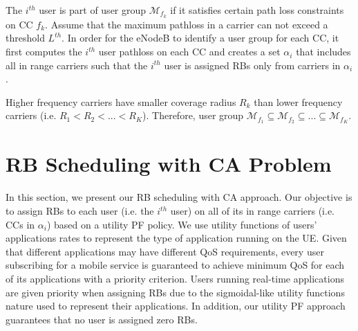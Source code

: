 \documentclass[conference]{IEEEtran}
\begin{document}
The $i^{th}$ user is part of user group $\mathcal{M}_{f_k}$ if it satisfies certain path loss constraints on CC $f_k$. Assume that the maximum pathloss in a carrier can not exceed a threshold $L^{th}$. In order for the eNodeB to identify a user group for each CC, it first computes the $i^{th}$ user pathloss on each CC and creates a set $\alpha_i$ that includes all in range carriers such that the $i^{th}$ user is assigned RBs only from carriers in $\alpha_i$.


Higher frequency carriers have smaller coverage radius $R_k$ than lower frequency carriers (i.e. $R_1<R_2<...<R_K$). Therefore, user group $\mathcal{M}_{f_1} \subseteq \mathcal{M}_{f_2} \subseteq ...\subseteq \mathcal{M}_{f_K}$. \section{RB Scheduling with CA Problem}\label{sec:RBscheduling}
In this section, we present our RB scheduling with CA approach. Our objective is to assign RBs to each user (i.e. the $i^{th}$ user) on all of its in range carriers (i.e. CCs in $\alpha_i$) based on a utility PF policy. We use utility functions of users' applications rates to represent the type of application running on the UE. Given that different applications may have different QoS requirements, every user subscribing for a mobile service is guaranteed to achieve minimum QoS for each of its applications with a priority criterion. Users running real-time applications are given priority when assigning RBs due to the sigmoidal-like utility functions nature used to represent their applications. In addition, our utility PF approach guarantees that no user is assigned zero RBs.
\end{document}
